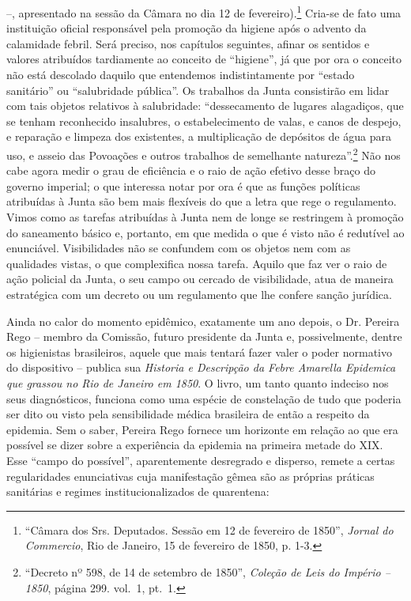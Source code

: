 --, apresentado na sessão da Câmara no dia 12 de fevereiro).\footnote{``Câmara
  dos Srs. Deputados. Sessão em 12 de fevereiro de 1850'', \emph{Jornal
  do Commercio}, Rio de Janeiro, 15 de fevereiro de 1850, p. 1-3.}
Cria-se de fato uma instituição oficial responsável pela promoção da
higiene após o advento da calamidade febril. Será preciso, nos capítulos
seguintes, afinar os sentidos e valores atribuídos tardiamente ao
conceito de ``higiene'', já que por ora o conceito não está descolado
daquilo que entendemos indistintamente por ``estado sanitário'' ou
``salubridade pública''. Os trabalhos da Junta consistirão em lidar com
tais objetos relativos à salubridade: ``dessecamento de lugares
alagadiços, que se tenham reconhecido insalubres, o estabelecimento de
valas, e canos de despejo, e reparação e limpeza dos existentes, a
multiplicação de depósitos de água para uso, e asseio das Povoações e
outros trabalhos de semelhante natureza''.\footnote{``Decreto nº 598, de
  14 de setembro de 1850'', \emph{Coleção de Leis do Império -- 1850},
  página 299. vol.~1, pt.~1.} Não nos cabe agora medir o grau de
eficiência e o raio de ação efetivo desse braço do governo imperial; o
que interessa notar por ora é que as funções políticas atribuídas à
Junta são bem mais flexíveis do que a letra que rege o regulamento.
Vimos como as tarefas atribuídas à Junta nem de longe se restringem à
promoção do saneamento básico e, portanto, em que medida o que é visto
não é redutível ao enunciável. Visibilidades não se confundem com os
objetos nem com as qualidades vistas, o que complexifica nossa tarefa.
Aquilo que faz ver o raio de ação policial da Junta, o seu campo ou
cercado de visibilidade, atua de maneira estratégica com um decreto ou
um regulamento que lhe confere sanção jurídica.

Ainda no calor do momento epidêmico, exatamente um ano depois, o Dr.
Pereira Rego -- membro da Comissão, futuro presidente da Junta e,
possivelmente, dentre os higienistas brasileiros, aquele que mais
tentará fazer valer o poder normativo do dispositivo -- publica sua
\emph{Historia e Descripção da Febre Amarella Epidemica que grassou no
Rio de Janeiro em 1850}. O livro, um tanto quanto indeciso nos seus
diagnósticos, funciona como uma espécie de constelação de tudo que
poderia ser dito ou visto pela sensibilidade médica brasileira de então
a respeito da epidemia. Sem o saber, Pereira Rego fornece um horizonte
em relação ao que era possível se dizer sobre a experiência da epidemia
na primeira metade do XIX. Esse ``campo do possível'', aparentemente
desregrado e disperso, remete a certas regularidades enunciativas cuja
manifestação gêmea são as próprias práticas sanitárias e regimes
institucionalizados de quarentena:

